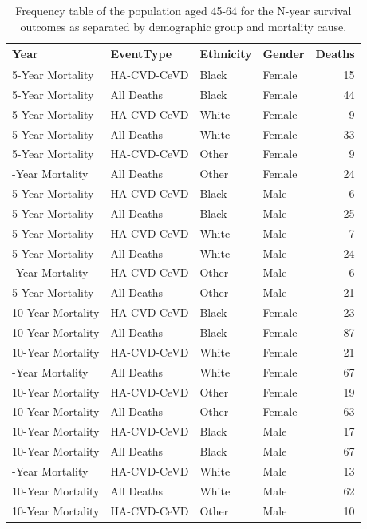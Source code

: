 \documentclass[
]{article}
\begin{document}
\begin{table}

\caption{\label{tab:DeathFreq1}Frequency table of the population aged 45-64 for the N-year survival outcomes as separated by demographic group and mortality cause.}
\centering
\begin{tabular}[t]{llllr}
\toprule
Year & EventType & Ethnicity & Gender & Deaths\\
\midrule
5-Year Mortality & HA-CVD-CeVD & Black & Female & 15\\
5-Year Mortality & All Deaths & Black & Female & 44\\
5-Year Mortality & HA-CVD-CeVD & White & Female & 9\\
5-Year Mortality & All Deaths & White & Female & 33\\
5-Year Mortality & HA-CVD-CeVD & Other & Female & 9\\
\addlinespace
5-Year Mortality & All Deaths & Other & Female & 24\\
5-Year Mortality & HA-CVD-CeVD & Black & Male & 6\\
5-Year Mortality & All Deaths & Black & Male & 25\\
5-Year Mortality & HA-CVD-CeVD & White & Male & 7\\
5-Year Mortality & All Deaths & White & Male & 24\\
\addlinespace
5-Year Mortality & HA-CVD-CeVD & Other & Male & 6\\
5-Year Mortality & All Deaths & Other & Male & 21\\
10-Year Mortality & HA-CVD-CeVD & Black & Female & 23\\
10-Year Mortality & All Deaths & Black & Female & 87\\
10-Year Mortality & HA-CVD-CeVD & White & Female & 21\\
\addlinespace
10-Year Mortality & All Deaths & White & Female & 67\\
10-Year Mortality & HA-CVD-CeVD & Other & Female & 19\\
10-Year Mortality & All Deaths & Other & Female & 63\\
10-Year Mortality & HA-CVD-CeVD & Black & Male & 17\\
10-Year Mortality & All Deaths & Black & Male & 67\\
\addlinespace
10-Year Mortality & HA-CVD-CeVD & White & Male & 13\\
10-Year Mortality & All Deaths & White & Male & 62\\
10-Year Mortality & HA-CVD-CeVD & Other & Male & 10\\

\end{tabular}
\end{table}
\end{document}
